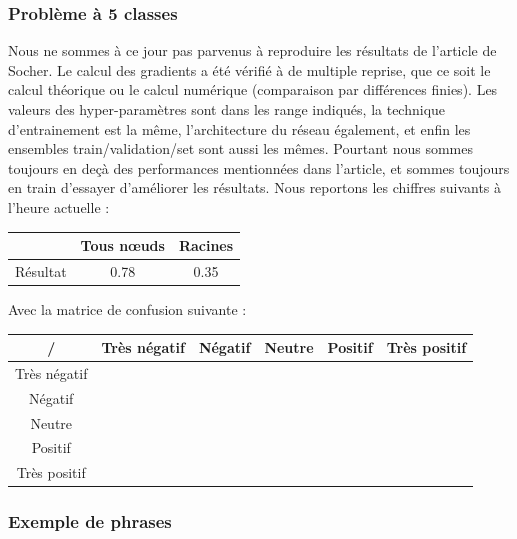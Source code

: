 \documentclass[conference]{IEEEtran}
\begin{document}
\subsubsection{Problème à 5 classes}
Nous ne sommes à ce jour pas parvenus à reproduire les résultats de l'article de Socher. Le calcul des gradients a été vérifié à de multiple reprise, que ce soit le calcul théorique ou le calcul numérique (comparaison par différences finies). Les valeurs des hyper-paramètres sont dans les range indiqués, la technique d'entrainement est la même, l'architecture du réseau également, et enfin les ensembles train/validation/set sont aussi les mêmes. Pourtant nous sommes toujours en deçà des performances mentionnées dans l'article, et sommes toujours en train d'essayer d'améliorer les résultats. Nous reportons les chiffres suivants à l'heure actuelle :

\centering
\begin{tabular}{|c|c|c|}
\hline
& Tous nœuds & Racines\\ \hline
Résultat & 0.78 & 0.35 \\ \hline
\end{tabular}

Avec la matrice de confusion suivante :
\centering
\begin{tabular}{|c|c|c|c|c|c|}
\hline
/& Très négatif & Négatif & Neutre & Positif & Très positif \\ \hline
Très négatif & & & & & \\ \hline
Négatif & & & & & \\ \hline
Neutre & & & & & \\ \hline
Positif & & & & & \\ \hline
Très positif & & & & & \\ \hline
\end{tabular}

\subsubsection{Exemple de phrases}
\end{document}
